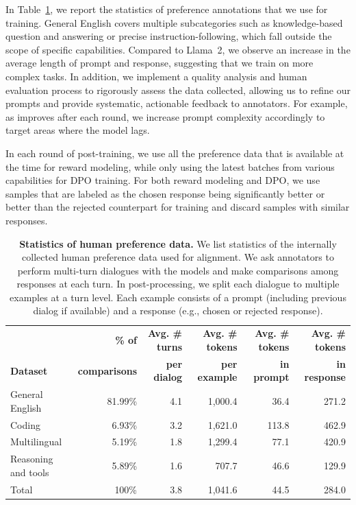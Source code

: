 \documentclass[dvipsnames]{fairmeta}
\begin{document}
In Table~\ref{tab:pref_data}, we report the statistics of preference annotations that we use for \llamathree training. 
General English covers multiple subcategories such as knowledge-based question and answering or precise instruction-following, which fall outside the scope of specific capabilities. Compared to Llama~2, we observe an increase in the average length of prompt and response, suggesting that we train \llamathree on more complex tasks. In addition, we implement a quality analysis and human evaluation process to rigorously assess the data collected, allowing us to refine our prompts and provide systematic, actionable feedback to annotators. For example, as \llamathree improves after each round, we increase prompt complexity accordingly to target areas where the model lags.

In each round of post-training, we use all the preference data that is available at the time for reward modeling, while only using the latest batches from various capabilities for DPO training. For both reward modeling and DPO, we use samples that are labeled as the chosen response being significantly better or better than the rejected counterpart for training and discard samples with similar responses.

\begin{table}[t]
  \centering
  \setlength{\tabcolsep}{4pt}
   {
  \begin{tabular}{@{}l@{\hspace*{0mm}}rrrrr@{}}
    \toprule
      & \textbf{\% of} & \textbf{Avg. \# turns} & \textbf{Avg. \# tokens} & \textbf{Avg. \# tokens} & \textbf{Avg. \# tokens} \\
     \textbf{Dataset} & \textbf{comparisons} &\textbf{per dialog} & \textbf{per example} &\textbf{in prompt} & \textbf{in response} \\
    \midrule
    General English & 81.99\% & 4.1 & 1,000.4 & 36.4 & 271.2 \\
    Coding & 6.93\% & 3.2 & 1,621.0 & 113.8 & 462.9 \\
    Multilingual & 5.19\% & 1.8 & 1,299.4 & 77.1 & 420.9 \\ 
    Reasoning and tools & 5.89\% & 1.6 & 707.7 & 46.6 & 129.9 \\
    \midrule
    Total & 100\% & 3.8 & 1,041.6 & 44.5 & 284.0 \\
    \bottomrule
  \end{tabular}}
  \vspace{0.3cm}
  \caption{\textbf{Statistics of human preference data.} We list statistics of the internally collected human preference data used for \llamathree alignment. We ask annotators to perform multi-turn dialogues with the models and make comparisons among responses at each turn. In post-processing, we split each dialogue to multiple examples at a turn level. Each example consists of a prompt (including previous dialog if available) and a response (e.g., chosen or rejected response).}
  \label{tab:pref_data}
\end{table}
\end{document}
